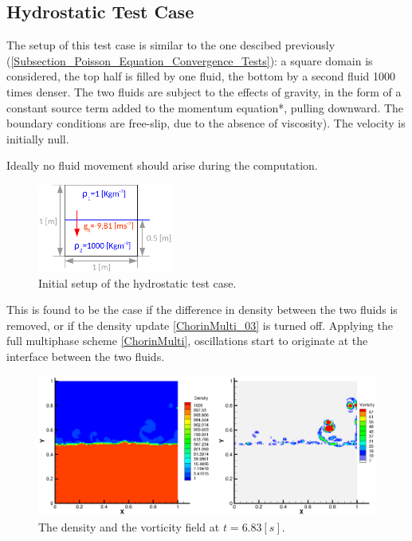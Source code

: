 \documentclass[11pt, a4paper, oneside, openany]{book}
\begin{document}
\subsection{Hydrostatic Test Case}\label{Section_Hydrostatic_Test_Case}
The setup of this test case is similar to the one descibed previously (\ref{Subsection_Poisson_Equation_Convergence_Tests}): a square domain is considered, the top half is filled by one fluid, the bottom by a second fluid 1000 times denser. The two fluids are subject to the effects of gravity, in the form of a constant source term added to the momentum equation*, pulling downward. The boundary conditions are free-slip, due to the absence of viscosity). The velocity is initially null.\par
Ideally no fluid movement should arise during the computation.
\begin{figure}[!ht]
	\centering
	\includegraphics[width=0.4\textwidth]{Hydrostatic_setup.pdf}
	\caption[Hydrostatic Test Case Setup]{Initial setup of the hydrostatic test case.}\label{HydrostaticSetup}
\end{figure}\noindent
This is found to be the case if the difference in density between the two fluids is removed, or if the density update \eqref{ChorinMulti_03} is turned off. Applying the full multiphase scheme \eqref{ChorinMulti}, oscillations start to originate at the interface between the two fluids.\par
\begin{figure}[!ht]
	\centering
	\includegraphics[width=1.1\textwidth]{HydrostaticT6p83.eps}
	\caption[Hydrostatic Test Density Viscosity]{The density and the vorticity field at $t = 6.83 [s]$.}\label{HydrostaticT6p83}
\end{figure}\noindent
\end{document}

